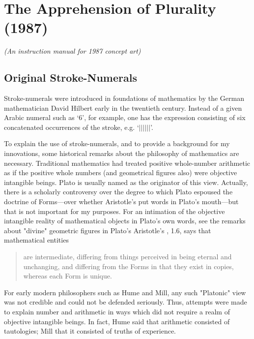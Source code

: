 \chapter{The Apprehension of Plurality (1987)}


{\centering\itshape
(An instruction manual for 1987 concept art)\par}

\section{Original Stroke-Numerals}

Stroke-numerals were introduced in foundations of mathematics 
by the German mathematician David Hilbert early in the twentieth 
century. Instead of a given Arabic numeral such as `6', for example, one 
has the expression consisting of six concatenated occurrences of the 
stroke, e.g. `$||||||$'. 

To explain the use of stroke-numerals, and to provide a background 
for my innovations, some historical remarks about the philosophy 
of mathematics are necessary. Traditional mathematics had 
treated positive whole-number arithmetic as if the positive whole 
numbers (and geometrical figures also) were objective intangible 
beings. Plato is usually named as the originator of this view. Actually, 
there is a scholarly controversy over the degree to which Plato espoused 
the doctrine of Forms---over whether Aristotle's  put 
words in Plato's mouth---but that is not important for my purposes. 
For an intimation of the objective intangible reality of mathematical 
objects in Plato's own words, see the remarks about "divine" geometric 
figures in Plato's  Aristotle's , 
1.6, says that mathematical entities 
\begin{quotation}
are intermediate, differing from things perceived in being eternal and 
unchanging, and differing from the Forms in that they exist in copies, 
whereas each Form is unique. 
\end{quotation}

For early modern philosophers such as Hume and Mill, any such 
"Platonic" view was not credible and could not be defended seriously. 
Thus, attempts were made to explain number and arithmetic in ways 
which did not require a realm of objective intangible beings. In fact, 
Hume said that arithmetic consisted of tautologies; Mill that it 
consisted of truths of experience. 

